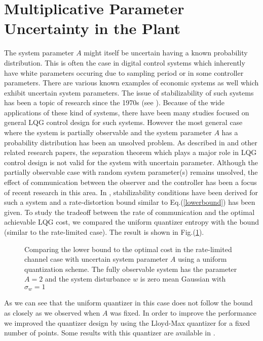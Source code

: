 \documentclass[12pt]{caltech_thesis_finalreport}
\begin{document}
\section{Multiplicative Parameter Uncertainty in the Plant}
	The system parameter $A$ might itself be uncertain having a known probability distribution. This is often the case in digital control systems which inherently have white parameters occuring due to sampling period or in some controller parameters. There are various known examples of economic systems as well which exhibit uncertain system parameters. The issue of stabilizability of such systems has been a topic of research since the 1970s (see \cite{utp}). Because of the wide applications of these kind of systems, there have been many studies focused on general LQG control design for such systems. However the most general case where the system is partially observable and the system parameter $A$ has a probability distribution has been an unsolved problem. As described in \cite{berstekas} and other related research papers, the separation theorem which plays a major role in LQG control design is not valid for the system with uncertain parameter. Although the partially observable case with random system parameter(s) remains unsolved, the effect of communication between the observer and the controller has been a focus of recent research in this area. In \cite{victoria2}, stabilizability conditions have been derived for such a system and a rate-distortion bound similar to Eq.(\ref{lowerbound}) has been given. To study the tradeoff between the rate of communication and the optimal achievable LQG cost, we compared the uniform quantizer entropy with the bound (similar to the rate-limited case). The result is shown in Fig.(\ref{bound_randomA}). 
	\begin{figure}[H]
			  \centering
%			  
			  \resizebox{15cm}{!}{}
			  \caption{Comparing the lower bound to the optimal cost in the rate-limited channel case with uncertain system parameter $A$ using a uniform quantization scheme. The fully observable system has the parameter $A = 2$ and the system disturbance $w$ is zero mean Gaussian with $\sigma_{w} = 1$}
			 \label{bound_randomA}
		\end{figure}	
		
	As we can see that the uniform quantizer in this case does not follow the bound as closely as we observed when $A$ was fixed. In order to improve the performance we improved the quantizer design by using the Lloyd-Max quantizer for a fixed number of points. Some results with this quantizer are available in \cite{git}.
\end{document}
